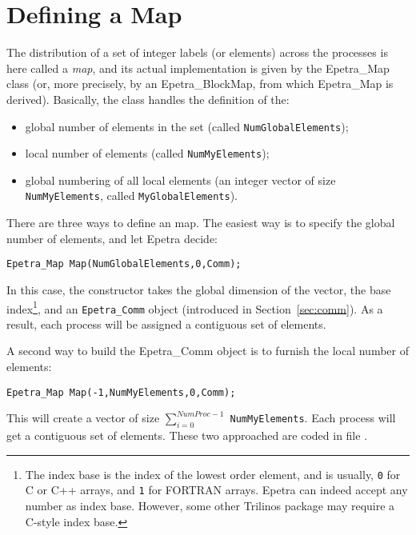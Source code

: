 
\section{Defining a Map}
\label{sec:map}

The distribution of a set of integer labels (or elements) across the
processes is here called a {\sl map}, and its actual implementation is
given by the Epetra\_Map class (or, more precisely, by an
Epetra\_BlockMap, from which Epetra\_Map is derived).  Basically, the
class handles the definition of the:
\begin{itemize}
\item global number of elements in the set (called
  \verb!NumGlobalElements!);
\item local number of elements (called \verb!NumMyElements!);
\item global numbering of all local elements (an integer vector of size
  \verb!NumMyElements!, called \verb!MyGlobalElements!).
\end{itemize}

There are  three ways to define an map. The easiest way is to
specify the global number of elements, and let Epetra decide:
\begin{verbatim}
Epetra_Map Map(NumGlobalElements,0,Comm);
\end{verbatim}
In this case, the constructor takes the global dimension of the vector,
the base index\footnote{The index base is the index of the lowest order
  element, and is usually, {\tt 0} for C or C++ arrays, and {\tt 1} for
  FORTRAN arrays. Epetra can indeed accept any number as index base.
  However, some other Trilinos package may require a C-style index
  base.}, and an \verb!Epetra_Comm!  object (introduced in
Section~\ref{sec:comm}). As a result, each process will be assigned a
contiguous set of elements.

A second way to build the Epetra\_Comm object is to furnish the local
number of elements:
\begin{verbatim}
Epetra_Map Map(-1,NumMyElements,0,Comm);
\end{verbatim}
This will create a vector of size $\sum_{i=0}^{NumProc-1}$
\verb!NumMyElements!. Each process will get a contiguous set of elements.
These two approached are coded in file \newline {}.

